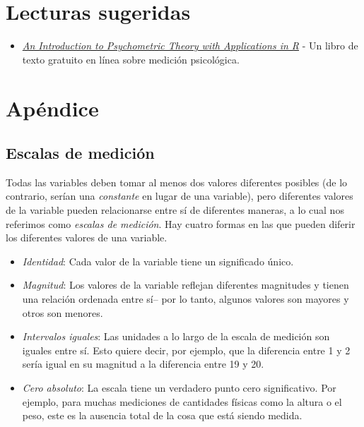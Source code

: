 \documentclass[
  12pt,
]{book}
\providecommand{\tightlist}{%
  \setlength{\itemsep}{0pt}\setlength{\parskip}{0pt}}
\begin{document}
\hypertarget{lecturas-sugeridas-1}{%
\section{Lecturas sugeridas}\label{lecturas-sugeridas-1}}

\begin{itemize}
\tightlist
\item
  \href{http://www.personality-project.org/r/book/}{\emph{An Introduction to Psychometric Theory with Applications in R}} - Un libro de texto gratuito en línea sobre medición psicológica.
\end{itemize}

\hypertarget{apuxe9ndice}{%
\section{Apéndice}\label{apuxe9ndice}}

\hypertarget{escalas-de-mediciuxf3n}{%
\subsection{Escalas de medición}\label{escalas-de-mediciuxf3n}}

Todas las variables deben tomar al menos dos valores diferentes posibles (de lo contrario, serían una \emph{constante} en lugar de una variable), pero diferentes valores de la variable pueden relacionarse entre sí de diferentes maneras, a lo cual nos referimos como \emph{escalas de medición}. Hay cuatro formas en las que pueden diferir los diferentes valores de una variable.

\begin{itemize}
\tightlist
\item
  \emph{Identidad}: Cada valor de la variable tiene un significado único.
\item
  \emph{Magnitud}: Los valores de la variable reflejan diferentes magnitudes y tienen una relación ordenada entre sí-- por lo tanto, algunos valores son mayores y otros son menores.
\item
  \emph{Intervalos iguales}: Las unidades a lo largo de la escala de medición son iguales entre sí. Esto quiere decir, por ejemplo, que la diferencia entre 1 y 2 sería igual en su magnitud a la diferencia entre 19 y 20.
\item
  \emph{Cero absoluto}: La escala tiene un verdadero punto cero significativo. Por ejemplo, para muchas mediciones de cantidades físicas como la altura o el peso, este es la ausencia total de la cosa que está siendo medida.
\end{itemize}
\end{document}
